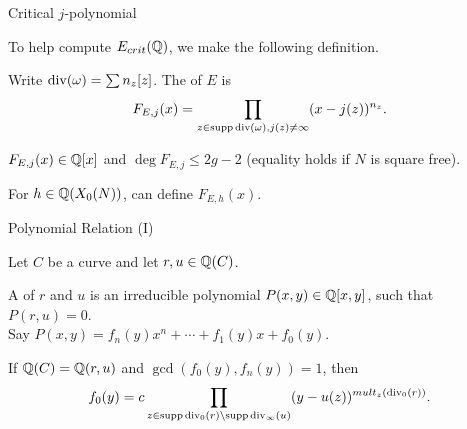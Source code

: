 \documentclass[handout]{beamer}
\begin{document}
\begin{frame}{Critical $j$-polynomial}





To help compute $E_{crit}(\mathbb{Q})$, we make the following definition. 
\begin{Def}
Write $\operatorname{div}(\omega) = \sum n_z[z]$. The  of $E$ is 
\[
F_{E,j}(x) = \prod_{z \in \operatorname{supp} \operatorname{div}(\omega), j(z) \neq \infty}(x-j(z))^{n_z}.
\]
\end{Def}
$F_{E,j}(x) \in \mathbb{Q}[x]$ and $\deg F_{E,j} \leq 2g-2$ (equality holds if $N$ is square free). 

\pause
\smallskip

For $h \in \mathbb{Q}(X_0(N))$, can define $F_{E,h}(x)$. 


\end{frame}


\begin{frame}{Polynomial Relation (I)}

Let $C$ be a curve and let $r, u \in \mathbb{Q}(C)$. 

A  of $r$ and $u$ is an irreducible polynomial $P(x,y) \in \mathbb{Q}[x,y]$, such that $P(r,u) = 0$.  \\

Say $P(x,y) = f_n(y)x^n + \cdots + f_1(y)x + f_0(y)$. 


\begin{Lemma}[C.]
\label{mult}
If $\mathbb{Q}(C) = \mathbb{Q}(r,u)$ and $\gcd(f_0(y), f_n(y)) = 1$, then 
\[
		f_0(y) = c \prod_{z \in \operatorname{supp} \operatorname{div}_{0}(r) \setminus  \operatorname{supp} \operatorname{div}_{\infty}(u)} (y - u(z))^{mult_z(\operatorname{div}_0(r))}.
\]
\end{Lemma}


\end{frame}
\end{document}
